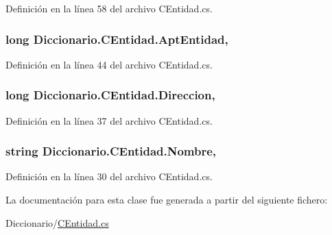 Definición en la línea 58 del archivo C\-Entidad.\-cs.

\hypertarget{class_diccionario_1_1_c_entidad_a813e698d00d5a66348242e55b003f3ab}{
\subsubsection[{Apt\-Entidad}]{\setlength{\rightskip}{0pt plus 5cm}long Diccionario.\-C\-Entidad.\-Apt\-Entidad\hspace{0.3cm}{\ttfamily [get]}, {\ttfamily [set]}}}\label{class_diccionario_1_1_c_entidad_a813e698d00d5a66348242e55b003f3ab}


Definición en la línea 44 del archivo C\-Entidad.\-cs.

\hypertarget{class_diccionario_1_1_c_entidad_aed4d0c8b3d1727d6f2a27651951a629a}{
\subsubsection[{Direccion}]{\setlength{\rightskip}{0pt plus 5cm}long Diccionario.\-C\-Entidad.\-Direccion\hspace{0.3cm}{\ttfamily [get]}, {\ttfamily [set]}}}\label{class_diccionario_1_1_c_entidad_aed4d0c8b3d1727d6f2a27651951a629a}


Definición en la línea 37 del archivo C\-Entidad.\-cs.

\hypertarget{class_diccionario_1_1_c_entidad_a27e42bd3f037ebf4e4f0a96cc3798a6f}{
\subsubsection[{Nombre}]{\setlength{\rightskip}{0pt plus 5cm}string Diccionario.\-C\-Entidad.\-Nombre\hspace{0.3cm}{\ttfamily [get]}, {\ttfamily [set]}}}\label{class_diccionario_1_1_c_entidad_a27e42bd3f037ebf4e4f0a96cc3798a6f}


Definición en la línea 30 del archivo C\-Entidad.\-cs.



La documentación para esta clase fue generada a partir del siguiente fichero\-:\begin{DoxyCompactItemize}
\item 
Diccionario/\hyperlink{_c_entidad_8cs}{C\-Entidad.\-cs}\end{DoxyCompactItemize}
